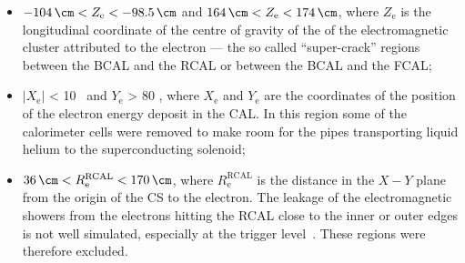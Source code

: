 \begin{itemize}
	\begin{itemize}
		\item $ -104\, \cm < Z_\text{e} < -98.5\, \cm	$ and $ 164\, \cm < Z_\text{e} < 174\, \cm $, where $Z_\text{e}$ is the longitudinal coordinate of the centre of gravity of the of the electromagnetic cluster attributed to the electron --- the so called ``super-crack'' regions between the BCAL and the RCAL or between the BCAL and the FCAL;
		\item $\left| X_\text{e} \right|$ < 10 \cm\, and $Y_\text{e}$ > 80 \cm, where $X_\text{e}$ and $Y_\text{e}$ are the coordinates of the position of the electron energy deposit in the CAL. In this region some of the calorimeter cells were removed to make room for the  pipes transporting  liquid helium to the superconducting solenoid;
		\item $ 36\, \cm < R^\text{RCAL}_\text{e} < 170\, \cm $, where $R^\text{RCAL}_\text{e}$ is the distance in the $X-Y$ plane from the origin of the \zeus CS to the electron. The leakage of the electromagnetic showers from the electrons hitting the RCAL close to the inner or outer edges is not well simulated, especially at the trigger level~\cite{januschek-p96}. These regions were therefore excluded. 
	\end{itemize}
\end{itemize}

